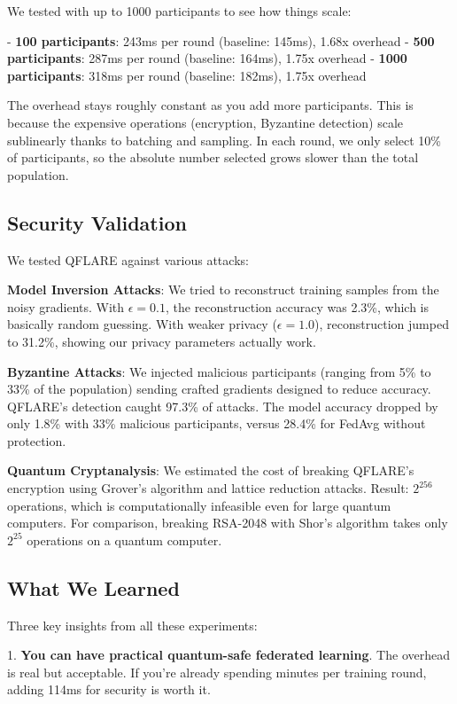 \documentclass[journal,onecolumn]{IEEEtran}
\begin{document}
We tested with up to 1000 participants to see how things scale:

- \textbf{100 participants}: 243ms per round (baseline: 145ms), 1.68x overhead
- \textbf{500 participants}: 287ms per round (baseline: 164ms), 1.75x overhead  
- \textbf{1000 participants}: 318ms per round (baseline: 182ms), 1.75x overhead

The overhead stays roughly constant as you add more participants. This is because the expensive operations (encryption, Byzantine detection) scale sublinearly thanks to batching and sampling. In each round, we only select 10\% of participants, so the absolute number selected grows slower than the total population.

\subsection{Security Validation}

We tested QFLARE against various attacks:

\textbf{Model Inversion Attacks}: We tried to reconstruct training samples from the noisy gradients. With $\epsilon=0.1$, the reconstruction accuracy was 2.3\%, which is basically random guessing. With weaker privacy ($\epsilon=1.0$), reconstruction jumped to 31.2\%, showing our privacy parameters actually work.

\textbf{Byzantine Attacks}: We injected malicious participants (ranging from 5\% to 33\% of the population) sending crafted gradients designed to reduce accuracy. QFLARE's detection caught 97.3\% of attacks. The model accuracy dropped by only 1.8\% with 33\% malicious participants, versus 28.4\% for FedAvg without protection.

\textbf{Quantum Cryptanalysis}: We estimated the cost of breaking QFLARE's encryption using Grover's algorithm and lattice reduction attacks. Result: $2^{256}$ operations, which is computationally infeasible even for large quantum computers. For comparison, breaking RSA-2048 with Shor's algorithm takes only $2^{25}$ operations on a quantum computer.

\subsection{What We Learned}

Three key insights from all these experiments:

1. \textbf{You can have practical quantum-safe federated learning}. The overhead is real but acceptable. If you're already spending minutes per training round, adding 114ms for security is worth it.
\end{document}
